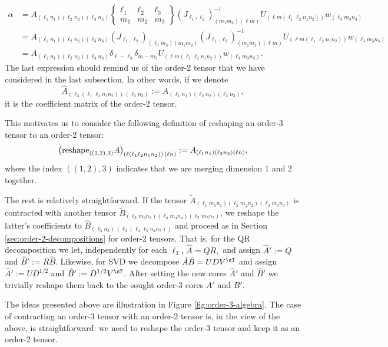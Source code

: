 \begin{align*}
\alpha
&=
A_{(\ell_1 n_1) (\ell_2 n_2) (\ell_3 n_3)}
\begin{Bmatrix}
    \ell_1 & \ell_2 & \ell_3 \\
    m_1 & m_2 & m_3
\end{Bmatrix}
(J_{\ell_1,\ell_2})^{-1}_{(m_1 m_2)(\ell m)} U_{(\ell m (\ell_1 \ell_2 n_1 n_2))} w_{(\ell_3 m_3 n_3)}
\\&=
A_{(\ell_1 n_1) (\ell_2 n_2) (\ell_3 n_3)}
(J_{\ell_1,\ell_2})_{(\ell_3 m_3)(m_1 m_2)}(J_{\ell_1,\ell_2})^{-1}_{(m_1 m_2)(\ell m)} U_{(\ell m (\ell_1 \ell_2 n_1 n_2))} w_{(\ell_3 m_3 n_3)}
\\&=
A_{(\ell_1 n_1) (\ell_2 n_2) (\ell_3 n_3)}
\delta_{\ell-\ell_3} \delta_{m-m_3}
U_{(\ell m (\ell_1 \ell_2 n_1 n_2))} w_{(\ell_3 m_3 n_3)}.
\end{align*}
The last expression should remind us of the order-2 tensor that we have considered in the last subsection.
In other words, if we denote
\[
\hat{A}_{(\ell_3 (\ell_1 \ell_2 n_1 n_2))\,(\ell_3 n_3)} := A_{(\ell_1 n_1) (\ell_2 n_2) (\ell_3 n_3)},
\]
it is the coefficient matrix of the order-2 tensor.

This motivates us to consider the following definition of reshaping an order-3 tensor to an order-2 tensor:
\[
\big({\rm reshape}_{((1,2),3)} A\big)_{(\ell (\ell_1 \ell_2 n_1 n_2))\,(\ell n)}
:= A_{(\ell_1 n_1) (\ell_2 n_2) (\ell n)},
\]
where the index $((1,2),3)$ indicates that we are merging dimension 1 and 2 together.

The rest is relatively straightforward.
If the tensor $\tilde{A}_{(\ell_1 m_1 n_1) (\ell_2 m_2 n_2) (\ell_3 m_3 n_3)}$ is contracted with another tensor $\tilde{B}_{(\ell_3 m_3 n_3) (\ell_4 m_4 n_4) (\ell_5 m_5 n_5)}$, we reshape the latter's coefficients to $
\hat{B}_{(\ell_3 n_3) \, (\ell_3 (\ell_4 \ell_5 n_4 n_5))}
$
and proceed as in Section \ref{sec:order-2-decompositions} for order-2 tensors.
That is, for the QR decomposition we let, independently for each $\ell_3$,
$
\hat{A}
= QR,
$
and assign
$\hat{A}' := Q$ and
$\hat{B}' := R \hat{B}$.
Likewise, for SVD we decompose
$\hat{A} \hat{B} = U D V^\sT$ and assign
$\hat{A}' := U D^{1/2}$ and $\hat{B}' := D^{1/2} V^\sT$.
After setting the new cores $\hat{A}'$ and $\hat{B}'$ we trivially reshape them back to the sought order-3 cores $A'$ and $B'$.

The ideas presented above are illustration in Figure \ref{fig:order-3-algebra}.
The case of contracting an order-3 tensor with an order-2 tensor is, in the view of the above, is straightforward: we need to reshape the order-3 tensor and keep it as an order-2 tensor.

